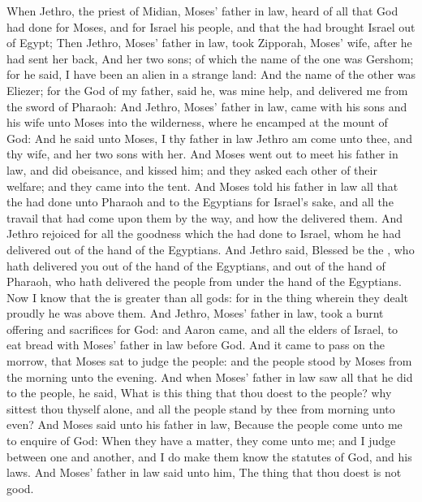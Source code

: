 \begin{biblechapter} %
 When Jethro, the priest of Midian, Moses' father in law, heard of all that God had done for Moses, and for Israel his people, and that the \LORD had brought Israel out of Egypt;
\verse Then Jethro, Moses' father in law, took Zipporah, Moses' wife, after he had sent her back,
\verse And her two sons; of which the name of the one was Gershom; for he said, I have been an alien in a strange land:
\verse And the name of the other was Eliezer; for the God of my father, said he, was mine help, and delivered me from the sword of Pharaoh:
\verse And Jethro, Moses' father in law, came with his sons and his wife unto Moses into the wilderness, where he encamped at the mount of God:
\verse And he said unto Moses, I thy father in law Jethro am come unto thee, and thy wife, and her two sons with her.
\verse And Moses went out to meet his father in law, and did obeisance, and kissed him; and they asked each other of their welfare; and they came into the tent.
\verse And Moses told his father in law all that the \LORD had done unto Pharaoh and to the Egyptians for Israel's sake, and all the travail that had come upon them by the way, and how the \LORD delivered them.
\verse And Jethro rejoiced for all the goodness which the \LORD had done to Israel, whom he had delivered out of the hand of the Egyptians.
\verse And Jethro said, Blessed be the \LORD, who hath delivered you out of the hand of the Egyptians, and out of the hand of Pharaoh, who hath delivered the people from under the hand of the Egyptians.
\verse Now I know that the \LORD is greater than all gods: for in the thing wherein they dealt proudly he was above them.
\verse And Jethro, Moses' father in law, took a burnt offering and sacrifices for God: and Aaron came, and all the elders of Israel, to eat bread with Moses' father in law before God.
\verse And it came to pass on the morrow, that Moses sat to judge the people: and the people stood by Moses from the morning unto the evening.
\verse And when Moses' father in law saw all that he did to the people, he said, What is this thing that thou doest to the people? why sittest thou thyself alone, and all the people stand by thee from morning unto even?
\verse And Moses said unto his father in law, Because the people come unto me to enquire of God:
\verse When they have a matter, they come unto me; and I judge between one and another, and I do make them know the statutes of God, and his laws.
\verse And Moses' father in law said unto him, The thing that thou doest is not good.

\end{biblechapter}
